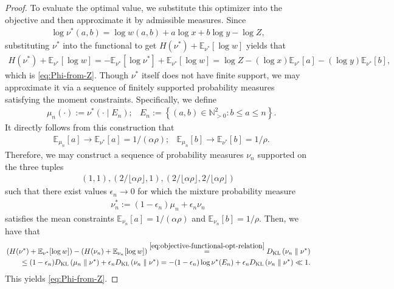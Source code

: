 \documentclass[11pt]{amsart}
\numberwithin{equation}{section}
\numberwithin{equation}{section}
\newcommand{\1}{\mathbbm{1}}
\newcommand{\E}{\mathbb{E}}
\newcommand{\KL}{D_{\mathrm{KL}}}
\newcommand{\doubleline}{\;\middle\|\;}
\newcommand{\N}{\mathbb{N}}
\theoremstyle{definition}
\begin{document}
\begin{proof}
    \medskip
    
    To evaluate the optimal value, we substitute this optimizer into the objective and then approximate it by admissible measures. Since 
    \begin{align*}
        \log\nu^*(a,b)=\log w(a,b)+a\log x+b\log y-\log Z,
    \end{align*}
    substituting $\nu^*$ into the functional to get $H(\nu^*)+\E_{\nu^*}[\log w]$ yields that
    \begin{align*}
        H(\nu^*)+\E_{\nu^*}[\log w] =-\E_{\nu^*}[\log\nu^*]+\E_{\nu^*}[\log w] =\log Z-(\log x)\E_{\nu^*}[a]-(\log y)\E_{\nu^*}[b],
    \end{align*}
    which is \eqref{eq:Phi-from-Z}. Though $\nu^*$ itself does not have finite support, we may approximate it via a sequence of finitely supported probability measures satisfying the moment constraints. Specifically, we define
    \begin{align*}
        & \mu_n(\cdot) := \nu^*\left( \cdot \mid E_n \right);
        & E_n := \left\{ (a,b) \in \N_{>0}^2: b \leq a \leq n \right\}.
    \end{align*}
    It directly follows from this construction that
    \begin{align*}
        & \E_{\mu_n}[a] \to \E_{\nu^*}[a] = 1/(\alpha \rho);
        & \E_{\mu_n}[b] \to \E_{\nu^*}[b] = 1/\rho.
    \end{align*}
    Therefore, we may construct a sequence of probability measures $\nu_n$ supported on the three tuples
    \begin{align*}
        (1,1), (2/ \lfloor \alpha \rho \rfloor, 1), (2/ \lfloor \alpha \rho \rfloor, 2/ \lfloor \alpha \rho \rfloor)
    \end{align*}
    such that there exist values $\epsilon_n \to 0$ for which the mixture probability measure
    \begin{align*}
        \nu_n^* := (1-\epsilon_n)\mu_n + \epsilon_n \nu_n
    \end{align*}
    satisfies the mean constraints $\E_{\nu_n}[a] = 1/(\alpha \rho)$ and $\E_{\nu_n}[b] = 1/\rho$. Then, we have that 
    \begin{align*}
        & \left( H(\nu^*)+\E_{\nu^*}[\log w] \right) - \left( H(\nu_n)+\E_{\nu_n}[\log w] \right) \stackrel{\eqref{eq:objective-functional-opt-relation}}{=} \KL\left( \nu_n \doubleline \nu^* \right) \\
        & \qquad \leq (1-\epsilon_n) \KL\left( \mu_n \doubleline \nu^* \right) + \epsilon_n \KL\left( \nu_n \doubleline \nu^* \right) = -(1-\epsilon_n)\log \nu^*(E_n) + \epsilon_n \KL\left( \nu_n \doubleline \nu^* \right) \ll 1.
    \end{align*}
    This yields \eqref{eq:Phi-from-Z}.
\end{proof}
\end{document}
